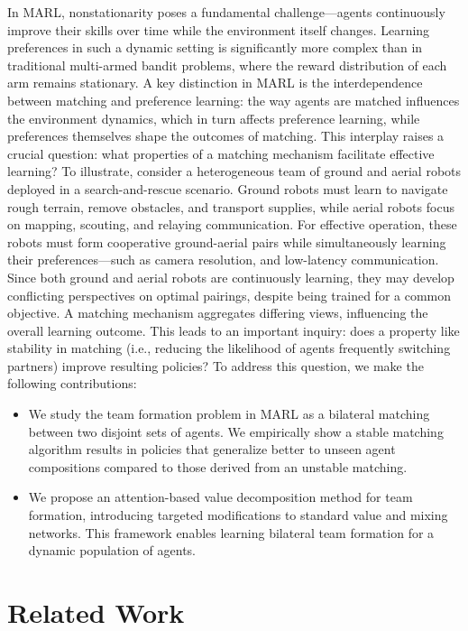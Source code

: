 \documentclass[10pt]{article} %
\begin{document}
In MARL, nonstationarity poses a fundamental challenge—agents continuously improve their skills over time while the environment itself changes. Learning preferences in such a dynamic setting is significantly more complex than in traditional multi-armed bandit problems, where the reward distribution of each arm remains stationary. A key distinction in MARL is the interdependence between matching and preference learning: the way agents are matched influences the environment dynamics, which in turn affects preference learning, while preferences themselves shape the outcomes of matching. This interplay raises a crucial question: what properties of a matching mechanism facilitate effective learning? To illustrate, consider a heterogeneous team of ground and aerial robots deployed in a search-and-rescue scenario. Ground robots must learn to navigate rough terrain, remove obstacles, and transport supplies, while aerial robots focus on mapping, scouting, and relaying communication. For effective operation, these robots must form cooperative ground-aerial pairs while simultaneously learning their preferences—such as camera resolution, and low-latency communication.
Since both ground and aerial robots are continuously learning, they may develop conflicting perspectives on optimal pairings, despite being trained for a common objective. A matching mechanism aggregates differing views, influencing the overall learning outcome.
This leads to an important inquiry: does a property like stability in matching (i.e., reducing the likelihood of agents frequently switching partners) improve resulting policies? To address this question, we make the following contributions:

\begin{itemize}
 \item We study the team formation problem in MARL as a bilateral matching between two disjoint sets of agents. We empirically show a stable matching algorithm results in policies that generalize better to unseen agent compositions compared to those derived from an unstable matching.
 \item We propose an attention-based value decomposition method for team formation, introducing targeted modifications to standard value and mixing networks. This framework enables learning bilateral team formation for a dynamic population of agents.
\end{itemize}


\section{Related Work}
\end{document}
